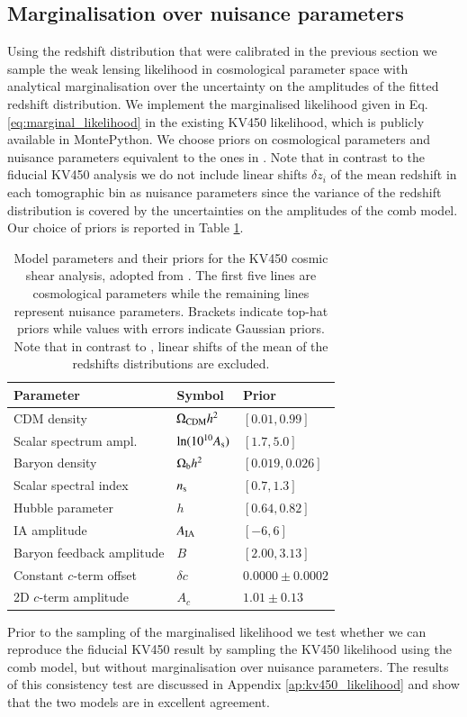 \documentclass{aa}
\begin{document}
\subsection{Marginalisation over nuisance parameters} 
Using the redshift distribution that were calibrated in the previous section we sample the weak lensing likelihood in cosmological parameter space with analytical marginalisation over the uncertainty on the amplitudes of the fitted redshift distribution. We implement the marginalised likelihood given in Eq. \ref{eq:marginal_likelihood} in the existing KV450 likelihood, which is publicly available in {\sc MontePython}. We choose priors on cosmological parameters and nuisance parameters equivalent to the ones in \cite{hildebrandt18}. Note that in contrast to the fiducial KV450 analysis we do not include linear shifts $\delta z_i$ of the mean redshift in each tomographic bin as nuisance parameters since the variance of the redshift distribution is covered by the uncertainties on the amplitudes of the comb model. Our choice of priors is reported in Table \ref{tab:priors}.
\begin{table}
\label{tab:priors}
\begin{tabular}{lll}
\hline
Parameter & Symbol & Prior\\
\hline
CDM density & $\Omega_{\rm CDM} h^2$ & $[0.01, 0.99]$\\
Scalar spectrum ampl. & $\ln(10^{10}A_{\rm s})$ & $[1.7, 5.0]$\\
Baryon density & $\Omega_{\rm b} h^2$ & $[0.019, 0.026]$ \\
Scalar spectral index & $n_{\rm s}$ & $[0.7, 1.3]$ \\
Hubble parameter & $h$ & $[0.64, 0.82]$ \\
\hline
IA amplitude & $A_{\rm IA}$ & $[-6, 6]$\\
Baryon feedback amplitude & $B$ & $[2.00, 3.13]$\\
Constant $c$-term offset & $\delta c$ & $0.0000\pm0.0002$ \\
2D $c$-term amplitude & $A_c$ & $1.01\pm0.13$\\
\hline
\end{tabular}
\caption{Model parameters and their priors for the KV450 cosmic shear analysis, adopted from \cite{hildebrandt18}. The first five lines are cosmological parameters while the remaining lines represent nuisance parameters. Brackets indicate top-hat priors while values with errors indicate Gaussian priors. Note that in contrast to \cite{hildebrandt18}, linear shifts of the mean of the redshifts distributions are excluded.}
\end{table}
Prior to the sampling of the marginalised likelihood we test whether we can reproduce the fiducial KV450 result by sampling the KV450 likelihood using the comb model, but without marginalisation over nuisance parameters. The results of this consistency test are discussed in Appendix \ref{ap:kv450_likelihood} and show that the two models are in excellent agreement. 
\end{document}
